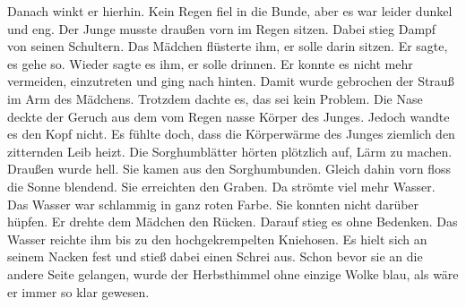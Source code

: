 \documentclass[prd,12pt,tightenlines,notitlepage,nofootinbib]{revtex4-1}
\begin{document}
Danach winkt er hierhin.  Kein Regen fiel in die Bunde, aber es war
leider dunkel und eng.  Der Junge musste draußen vorn im Regen
sitzen.  Dabei stieg Dampf von seinen Schultern.  Das Mädchen
flüsterte ihm, er solle darin sitzen.  Er sagte, es gehe so.  Wieder
sagte es ihm, er solle drinnen.  Er konnte es nicht mehr vermeiden,
einzutreten und ging nach hinten.
Damit wurde gebrochen der Strauß im Arm des
Mädchens.  Trotzdem dachte es, das sei kein Problem.  Die Nase deckte
der Geruch aus dem vom Regen nasse Körper des Junges.  Jedoch wandte
es den Kopf nicht.  Es fühlte doch, dass die Körperwärme des Junges
ziemlich den zitternden Leib heizt.  Die Sorghumblätter hörten
plötzlich auf, Lärm zu machen.  Draußen wurde hell.  Sie kamen aus
den Sorghumbunden.  Gleich dahin vorn floss die Sonne blendend.  Sie
erreichten den Graben.  Da strömte viel mehr Wasser.  Das Wasser war
schlammig in ganz roten Farbe.  Sie konnten nicht darüber hüpfen.  Er
drehte dem Mädchen den Rücken.  Darauf stieg es ohne Bedenken.  Das
Wasser reichte ihm bis zu den hochgekrempelten Kniehosen.  Es hielt
sich an seinem Nacken fest und stieß dabei einen Schrei aus.  Schon
bevor sie an die andere Seite gelangen, wurde der Herbsthimmel ohne
einzige Wolke blau, als wäre er immer so klar gewesen.
\end{document}
